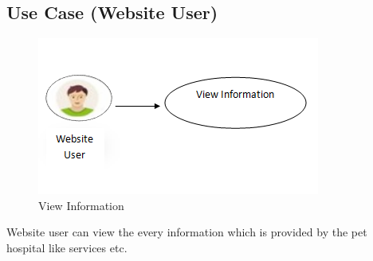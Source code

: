 \subsection{Use Case (Website User)}
\begin{figure}[H]
  \centering
    \includegraphics{42UseCase}
		\caption{View Information}
\end{figure}
Website user can view the every information which is provided by the pet hospital like services etc.
